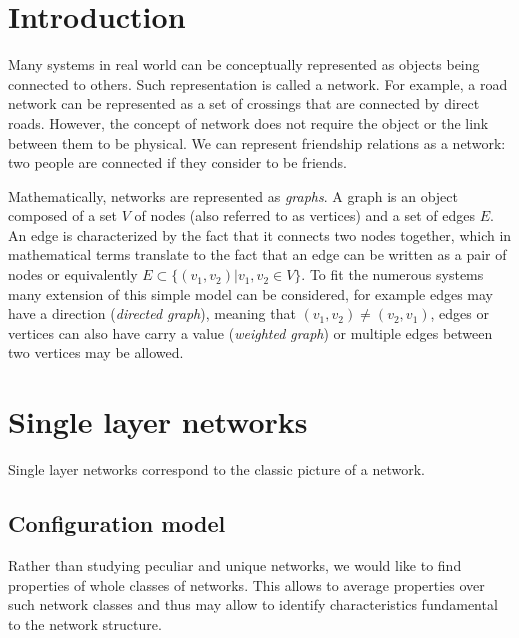 \documentclass[
11pt, %
english, %
singlespacing, %
liststotoc, %
headsepline, %
]{MastersDoctoralThesis} %
\newcommand{\set}[1]{\{#1\}}
\begin{document}
\pagestyle{thesis} %

\listoftodos

\chapter{Introduction}

Many systems in real world can be conceptually represented as objects being connected to others. Such representation is called a network. For example, a road network can be represented as a set of crossings that are connected by direct roads. However, the concept of network does not require the object or the link between them to be physical. We can represent friendship relations as a network: two people are connected if they consider to be friends.

Mathematically, networks are represented as \emph{graphs}. A graph is an object composed of a set $V$ of nodes (also referred to as vertices) and a set of edges $E$. An edge is characterized by the fact that it connects two nodes together, which in mathematical terms translate to the fact that an edge can be written as a pair of nodes or equivalently $E \subset \set{(v_1, v_2) | v_1, v_2 \in V }$. To fit the numerous systems many extension of this simple model can be considered, for example edges may have a direction (\emph{directed graph}), meaning that $(v_1, v_2) \neq (v_2, v_1)$, edges or vertices can also have carry a value (\emph{weighted graph}) or multiple edges between two vertices may be allowed.



\chapter{Single layer networks}

Single layer networks correspond to the classic picture of a network.

\section{Configuration model}

Rather than studying peculiar and unique networks, we would like to  find properties of whole classes of networks. This allows to average properties over such network classes and thus may allow to identify characteristics fundamental to the network structure.
\end{document}
